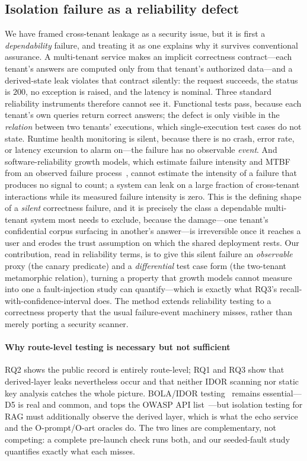 \IfFileExists{IEEEtran.cls}{\documentclass[conference]{IEEEtran}}{\documentclass[10pt,twocolumn]{article}}
\begin{document}
\subsection{Isolation failure as a reliability defect}
\label{sec:reliability}
We have framed cross-tenant leakage as a security issue, but it is first a \emph{dependability}
failure, and treating it as one explains why it survives conventional assurance. A multi-tenant
service makes an implicit correctness contract---each tenant's answers are computed only from that
tenant's authorized data---and a derived-state leak violates that contract silently: the request
succeeds, the status is $200$, no exception is raised, and the latency is nominal. Three standard
reliability instruments therefore cannot see it. Functional tests pass, because each tenant's own
queries return correct answers; the defect is only visible in the \emph{relation} between two
tenants' executions, which single-execution test cases do not state. Runtime health monitoring is
silent, because there is no crash, error rate, or latency excursion to alarm on---the failure has no
observable \emph{event}. And software-reliability growth models, which estimate failure intensity and
MTBF from an observed failure process~\cite{jia2011mutation}, cannot estimate the intensity of a
failure that produces no signal to count; a system can leak on a large fraction of cross-tenant
interactions while its measured failure intensity is zero. This is the defining shape of a
\emph{silent} correctness failure, and it is precisely the class a dependable multi-tenant system
most needs to exclude, because the damage---one tenant's confidential corpus surfacing in another's
answer---is irreversible once it reaches a user and erodes the trust assumption on which the shared
deployment rests. Our contribution, read in reliability terms, is to give this silent failure an
\emph{observable} proxy (the canary predicate) and a \emph{differential} test case form (the
two-tenant metamorphic relation), turning a property that growth models cannot measure into one a
fault-injection study can quantify---which is exactly what RQ3's recall-with-confidence-interval
does. The method extends reliability testing to a correctness property that the usual failure-event
machinery misses, rather than merely porting a security scanner.

\paragraph{Why route-level testing is necessary but not sufficient}
RQ2 shows the public record is entirely route-level; RQ1 and RQ3 show that derived-layer leaks
nevertheless occur and that neither IDOR scanning nor static key analysis catches the whole picture.
BOLA/IDOR testing~\cite{arcuri2025fuzzbola,corradini2023massassign,santos2025bolapetri} remains
essential---D5 is real and common, and tops the OWASP API list~\cite{owasp2023api}---but isolation
testing for RAG must additionally observe the derived layer, which is what the echo service and the
O-prompt/O-art oracles do. The two lines are complementary, not competing: a complete pre-launch
check runs both, and our seeded-fault study quantifies exactly what each misses.
\end{document}
